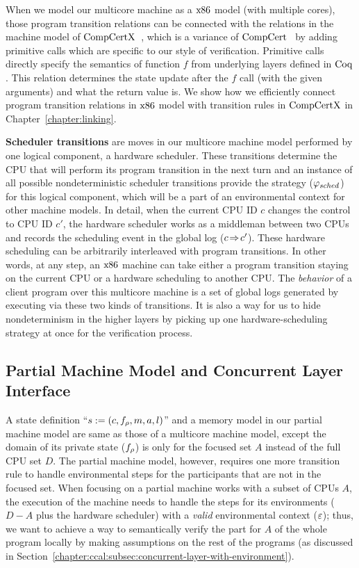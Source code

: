 When we model our multicore machine as a $\mathrm{x86}$ model (with multiple cores),
those program transition relations can be connected with the relations 
in the machine model of $\mathrm{CompCertX}$~\cite{deepspec},
which is a variance of $\mathrm{CompCert}$~\cite{leroy09}
by adding primitive calls which are specific to our style of verification.
Primitive calls directly specify the semantics of function $f$ from underlying layers defined in $\mathrm{Coq}$. 
This relation determines the state update after the $f$ call (with the given arguments) and what the return value is.
We show how we efficiently connect program transition relations in 
$\mathrm{x86}$ model with transition rules in $\mathrm{CompCertX}$ in Chapter~\ref{chapter:linking}.

\textbf{Scheduler transitions} are moves in our multicore machine model performed by one logical component, a hardware scheduler.
 These transitions determine  the CPU that will perform its program transition 
in the next turn and 
an instance of all possible nondeterministic scheduler transitions provide 
the strategy   ($\varphi_{sched}$) for this logical component, 
which will be a part of an environmental context for other machine models. 
In detail, when the current CPU ID $c$ changes
the control to CPU ID $c'$,
the hardware scheduler works as a
middleman between 
two CPUs and records the scheduling event 
in the global log ($c \!\Rightarrow\! c'$).
These hardware scheduling
can be arbitrarily interleaved with
program transitions.
In other words, at any step,
an $\mathrm{x86}$ machine can take either a program transition staying
on the current CPU
or a hardware scheduling to another CPU.
The \emph{behavior} of a client program  over this multicore machine is a set of global logs generated by executing  via these two kinds of transitions.
It is also a way for us to hide nondeterminism in the higher layers
by picking up 
one hardware-scheduling strategy at once for the verification process.

\subsection{Partial  Machine Model and Concurrent Layer Interface}
\label{chapter:ccal:subsec:concurrent-layer-interface}


A state definition ``$s := (c, f_{\rho}, m, a, l)$'' and a memory model in our partial machine model are
same as those of a multicore machine model, 
except the domain of its private state ($f_{\rho}$) is only for the focused set $A$ instead of the full CPU set $D$.
The partial machine model, however, requires one more transition rule to handle environmental steps for the participants that are not in the focused set.
When focusing on a partial machine works with a subset of CPUs $A$,
the execution of the machine needs to handle 
the steps for its environments ($D - A$ plus the hardware scheduler) with a \textit{valid} environmental context (${\varepsilon}$);
thus, we want to  achieve a way to semantically verify the part for $A$ of the whole program locally
by making  assumptions on the rest of the programs (as discussed in Section~\ref{chapter:ccal:subsec:concurrent-layer-with-environment}).

